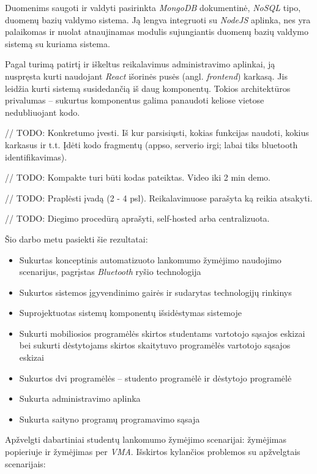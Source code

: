\documentclass{VUMIFPSbakalaurinis}
\begin{document}
Duomenims saugoti ir valdyti pasirinkta \textit{MongoDB} dokumentinė, \textit{NoSQL} tipo, duomenų bazių valdymo sistema. Ją lengva integruoti su \textit{NodeJS} aplinka, nes yra palaikomas ir nuolat atnaujinamas modulis sujungiantis duomenų bazių valdymo sistemą su kuriama sistema.

Pagal turimą patirtį ir iškeltus reikalavimus administravimo aplinkai, ją nuspręsta kurti naudojant \textit{React} išorinės pusės (angl. \textit{frontend}) karkasą. Jis leidžia kurti sistemą susidedančią iš daug komponentų. Tokios architektūros privalumas – sukurtus komponentus galima panaudoti keliose vietose nedubliuojant kodo.

// TODO: Konkretumo įvesti. Iš kur parsisiųsti, kokias funkcijas naudoti, kokius karkasus ir t.t. Įdėti kodo fragmentų (appso, serverio irgi; labai tiks bluetooth identifikavimas). 

// TODO: Kompakte turi būti kodas pateiktas. Video iki 2 min demo.

// TODO: Praplėsti įvadą (2 - 4 psl). Reikalavimuose parašyta ką reikia atsakyti.

// TODO: Diegimo procedūrą aprašyti, self-hosted arba centralizuota.


Šio darbo metu pasiekti šie rezultatai:

\begin{itemize}

	\item Sukurtas konceptinis automatizuoto lankomumo žymėjimo naudojimo scenarijus, pagrįstas \textit{Bluetooth} ryšio technologija
	\item Sukurtos sistemos įgyvendinimo gairės ir sudarytas technologijų rinkinys
	\item Suprojektuotas sistemų komponentų išsidėstymas sistemoje
	\item Sukurti mobiliosios programėlės skirtos studentams vartotojo sąsajos eskizai bei sukurti dėstytojams skirtos skaitytuvo programėlės vartotojo sąsajos eskizai
	\item Sukurtos dvi programėlės – studento programėlė ir dėstytojo programėlė
	\item Sukurta administravimo aplinka
	\item Sukurta saityno programų programavimo sąsaja
\end{itemize}

Apžvelgti dabartiniai studentų lankomumo žymėjimo scenarijai: žymėjimas popieriuje ir žymėjimas per \textit{VMA}. Išskirtos kylančios problemos su apžvelgtais scenarijais:
\end{document}
